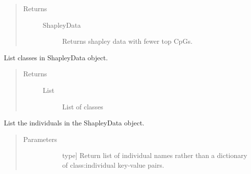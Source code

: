 \documentclass[letterpaper,10pt,english]{sphinxmanual}
\begin{document}
\begin{fulllineitems}
\begin{fulllineitems}
\begin{quote}
\begin{description}
\begin{description}
\end{description}

\item[{Returns}] \leavevmode\begin{description}
\item[{ShapleyData}] \leavevmode
Returns shapley data with fewer top CpGs.

\end{description}

\end{description}\end{quote}

\end{fulllineitems}


\begin{fulllineitems}
\label{\detokenize{index:methylnet.interpretation_classes.ShapleyDataExplorer.list_classes}}
List classes in ShapleyData object.
\begin{quote}\begin{description}
\item[{Returns}] \leavevmode\begin{description}
\item[{List}] \leavevmode
List of classes

\end{description}

\end{description}\end{quote}

\end{fulllineitems}


\begin{fulllineitems}
\label{\detokenize{index:methylnet.interpretation_classes.ShapleyDataExplorer.list_individuals}}
List the individuals in the ShapleyData object.
\begin{quote}\begin{description}
\item[{Parameters}] \leavevmode\begin{description}
\item[{}] \leavevmode{[}type{]}
Return list of individual names rather than a dictionary of class:individual key-value pairs.


\end{description}
\end{description}
\end{quote}
\end{fulllineitems}
\end{fulllineitems}
\end{document}

